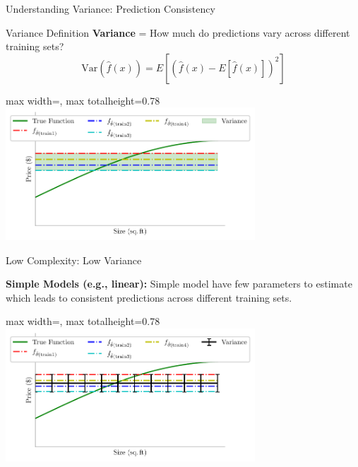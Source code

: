 \documentclass[10pt]{beamer}
\newcommand{\fitpic}[1]{\begin{adjustbox}{max width=\linewidth, max totalheight=0.78\textheight}#1\end{adjustbox}}
\begin{document}
\begin{frame}{Understanding Variance: Prediction Consistency}
\begin{definitionbox}{Variance Definition}
\textbf{Variance} = How much do predictions vary across different training sets?
$$\text{Var}(\hat{f}(x)) = E[(\hat{f}(x) - E[\hat{f}(x)])^2]$$
\end{definitionbox}

\begin{center}
\fitpic{\includegraphics[width=0.7\textwidth]{../assets/bias-variance/figures/var1_latexify.pdf}}
\end{center}


\end{frame}

\begin{frame}{Low Complexity: Low Variance}
\begin{keypointsbox}
\textbf{Simple Models (e.g., linear):} Simple model have few parameters to estimate which leads to consistent predictions across different training sets.

\end{keypointsbox}

\begin{center}
\fitpic{\includegraphics[width=0.7\textwidth]{../assets/bias-variance/figures/var2_latexify.pdf}}
\end{center}

\end{frame}
\end{document}

